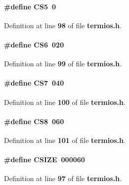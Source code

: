\paragraph[{C\+S5}]{\setlength{\rightskip}{0pt plus 5cm}\#define C\+S5~0}\label{termios_8h_a4d47fc38b83dc3e81f6075313cb8e8b2}


Definition at line {\bf 98} of file {\bf termios.\+h}.

\paragraph[{C\+S6}]{\setlength{\rightskip}{0pt plus 5cm}\#define C\+S6~020}\label{termios_8h_a9cf7186015f5a77e4796eee416867ab3}


Definition at line {\bf 99} of file {\bf termios.\+h}.

\paragraph[{C\+S7}]{\setlength{\rightskip}{0pt plus 5cm}\#define C\+S7~040}\label{termios_8h_a92de6c3a5fad380a69d67671987822b1}


Definition at line {\bf 100} of file {\bf termios.\+h}.

\paragraph[{C\+S8}]{\setlength{\rightskip}{0pt plus 5cm}\#define C\+S8~060}\label{termios_8h_a083623175b34340b14359a57c5107232}


Definition at line {\bf 101} of file {\bf termios.\+h}.

\paragraph[{C\+S\+I\+ZE}]{\setlength{\rightskip}{0pt plus 5cm}\#define C\+S\+I\+ZE~000060}\label{termios_8h_ad8f114959b29521f5e2bb245cc6bf62a}


Definition at line {\bf 97} of file {\bf termios.\+h}.

